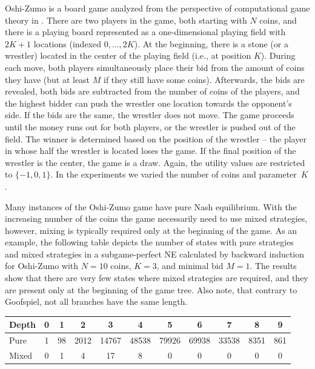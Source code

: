 Oshi-Zumo is a board game analyzed from the perspective of computational game theory in \cite{buro2003}.
There are two players in the game, both starting with $N$ coins, and there is a playing board represented as a one-dimensional playing field with $2K+1$ locations (indexed $0, \ldots, 2K$).
At the beginning, there is a stone (or a wrestler) located in the center of the playing field (i.e., at position $K$).
During each move, both players simultaneously place their bid from the amount of coins they have (but at least $M$ if they still have some coins).
Afterwards, the bids are revealed, both bids are subtracted from the number of coins of the players, and the highest bidder can push the wrestler one location towards the opponent's side.
If the bids are the same, the wrestler does not move. 
The game proceeds until the money runs out for both players, or the wrestler is pushed out of the field. 
The winner is determined based on the position of the wrestler -- the player in whose half the wrestler is located loses the game. 
If the final position of the wrestler is the center, the game is a draw.
Again, the utility values are restricted to $\lbrace -1, 0, 1 \rbrace$.
In the experiments we varied the number of coins and parameter~$K$.

Many instances of the Oshi-Zumo game have pure Nash equilibrium.
With the increasing number of the coins the game necessarily need to use mixed strategies, however, mixing is typically required only at the beginning of the game. 
As an example, the following table depicts the number of states with pure strategies and mixed strategies in a subgame-perfect NE calculated by backward induction for Oshi-Zumo with $N=10$ coins, $K=3$, and minimal bid $M=1$. The results show that there are very few states where mixed strategies are required, and they are present only at the beginning of the game tree. Also note, that contrary to Goofspiel, not all branches have the same length.

\vspace{0.1cm}

\begin{center}
\small
\begin{tabular}{|l|c|c|c|c|c|c|c|c|c|c|}
\hline Depth & 0 & 1 & 2 & 3 & 4 & 5 & 6 & 7 & 8 & 9\\
\hline Pure  & 1 & 98 & 2012 & 14767 & 48538 & 79926 & 69938 & 33538 & 8351 & 861\\
\hline Mixed & 0 &  1 &  4 &  17 & 8 & 0 & 0 & 0 & 0 & 0 \\
\hline
\end{tabular}
\end{center}

